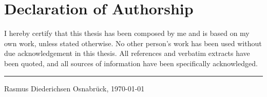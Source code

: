\chapter*{Declaration of Authorship}

I hereby certify that this thesis has been composed by me and is based on my own work, unless
stated otherwise. No other person’s work has been used without due acknowledgement in this
thesis. All references and verbatim extracts have been quoted, and all sources of information
have been specifically acknowledged. 

\vspace{2cm}

\noindent\rule{5cm}{1pt}

\noindent Rasmus Diederichsen \hfill{} Osnabrück, \today
